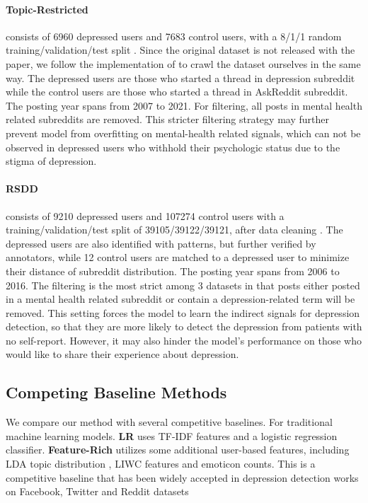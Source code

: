 \paragraph{Topic-Restricted} consists of 6960 depressed users and 7683 control users, with a 8/1/1 random training/validation/test split \citep{wolohan2018detecting}. Since the original dataset is not released with the paper, we follow the implementation of \citet{harrigian2020models} to crawl the dataset ourselves in the same way. The depressed users are those who started a thread in depression subreddit while the control users are those who started a thread in AskReddit subreddit. The posting year spans from 2007 to 2021. For filtering, all posts in mental health related subreddits are removed. This stricter filtering strategy may further prevent model from overfitting on mental-health related signals, which can not be observed in depressed users who withhold their psychologic status due to the stigma of depression. 

\paragraph{RSDD} consists of 9210 depressed users and 107274 control users with a training/validation/test split of 39105/39122/39121, after data cleaning \citep{yates2017depression}. The depressed users are also identified with patterns, but further verified by annotators, while 12 control users are matched to a depressed user to minimize their distance of subreddit distribution. The posting year spans from 2006 to 2016. The filtering is the most strict among 3 datasets in that posts either posted in a mental health related subreddit or contain a depression-related term will be removed. This setting forces the model to learn the indirect signals for depression detection, so that they are more likely to detect the depression from patients with no self-report. However, it may also hinder the model's performance on those who would like to share their experience about depression.


\subsection{Competing Baseline Methods}
We compare our method with several competitive baselines. For traditional machine learning models. \textbf{LR} uses TF-IDF features and a logistic regression classifier. \textbf{Feature-Rich} utilizes some additional user-based features, including LDA topic distribution \citep{blei2003latent}, LIWC features \citep{pennebaker2001linguistic} and emoticon counts. This is a competitive baseline that has been widely accepted in depression detection works on Facebook, Twitter and Reddit datasets \citep{eichstaedt2018facebook,trotzek2018utilizing,harrigian2020models}

